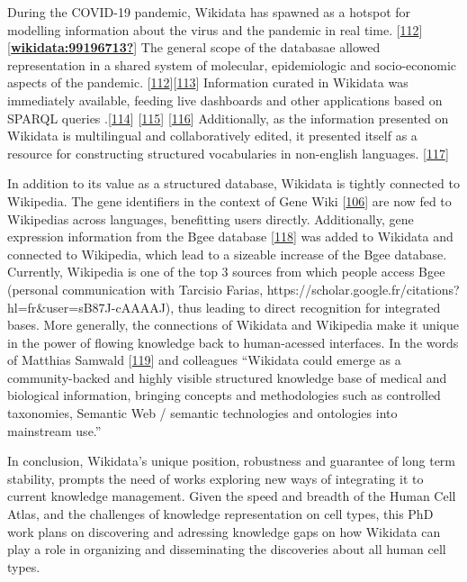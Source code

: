 During the COVID-19 pandemic, Wikidata has spawned as a hotspot for modelling information about the virus and the pandemic in real time. {[}\protect\hyperlink{ref-zH3KDqhp}{112}{]} {[}\protect\hyperlink{ref-wikidata:99196713}{\textbf{wikidata:99196713?}}{]}
The general scope of the databasae allowed representation in a shared system of molecular, epidemiologic and socio-economic aspects of the pandemic. {[}\protect\hyperlink{ref-zH3KDqhp}{112}{]}{[}\protect\hyperlink{ref-mPoPwN77}{113}{]}
Information curated in Wikidata was immediately available, feeding live dashboards and other applications based on SPARQL queries .{[}\protect\hyperlink{ref-3YCzr3jU}{114}{]} {[}\protect\hyperlink{ref-SkOeuFRd}{115}{]} {[}\protect\hyperlink{ref-AOVCR8mW}{116}{]}
Additionally, as the information presented on Wikidata is multilingual and collaboratively edited, it presented itself as a resource for constructing structured vocabularies in non-english languages. {[}\protect\hyperlink{ref-19wiU1LCA}{117}{]}

In addition to its value as a structured database, Wikidata is tightly connected to Wikipedia.
The gene identifiers in the context of Gene Wiki {[}\protect\hyperlink{ref-2ZhxC0dg}{106}{]} are now fed to Wikipedias across languages, benefitting users directly.
Additionally, gene expression information from the Bgee database {[}\protect\hyperlink{ref-10EWNsZCz}{118}{]} was added to Wikidata and connected to Wikipedia, which lead to a sizeable increase of the Bgee database. Currently, Wikipedia is one of the top 3 sources from which people access Bgee (personal communication with Tarcisio Farias, https://scholar.google.fr/citations?hl=fr\&user=sB87J-cAAAAJ), thus leading to direct recognition for integrated bases.
More generally, the connections of Wikidata and Wikipedia make it unique in the power of flowing knowledge back to human-acessed interfaces.
In the words of Matthias Samwald {[}\protect\hyperlink{ref-864Pcm4C}{119}{]} and colleagues ``Wikidata could emerge as a community-backed and highly visible structured knowledge base of medical and biological information, bringing concepts and methodologies such as controlled taxonomies, Semantic Web / semantic technologies and ontologies into mainstream use.''

In conclusion, Wikidata's unique position, robustness and guarantee of long term stability, prompts the need of works exploring new ways of integrating it to current knowledge management.
Given the speed and breadth of the Human Cell Atlas, and the challenges of knowledge representation on cell types, this PhD work plans on discovering and adressing knowledge gaps on how Wikidata can play a role in organizing and disseminating the discoveries about all human cell types.

